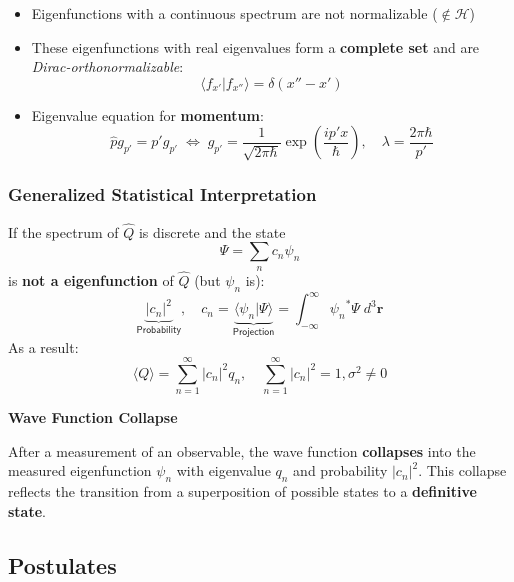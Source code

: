 \newpar{}
\begin{itemize}
    \item Eigenfunctions with a continuous spectrum are not normalizable ($\notin \mathcal{H}$)
    \item These eigenfunctions with real eigenvalues form a \textbf{complete set} and are \textit{Dirac-orthonormalizable}:
          \noindent\begin{equation*}
              \langle f_{x'}|f_{x''}\rangle=\delta(x''-x')
          \end{equation*}
    \item Eigenvalue equation for \textbf{momentum}:
          \noindent\begin{equation*}
              \widehat{p}g_{p'}= p'g_{p'}\;\Leftrightarrow\; g_{p'}=\frac{1}{\sqrt{2\pi\hbar}} \exp\left(\frac{ip'x}{\hbar}\right), \quad \lambda = \frac{2\pi\hbar}{p'}
          \end{equation*}
\end{itemize}

\subsubsection{Generalized Statistical Interpretation}\label{midterm:gen_stat}
If the spectrum of $\hat{Q}$ is discrete and the state
\begin{equation*}
    \Psi=\sum_n c_n \psi_n
\end{equation*}
is \textbf{not a eigenfunction} of $\hat{Q}$ (but $\psi_n$ is):
\noindent\begin{equation*}
    \underbrace{|c_n|^2}_{\textsf{Probability}}, \quad c_n = \underbrace{\langle \psi_n|\Psi\rangle}_{\textsf{Projection}} =\int_{-\infty}^{\infty} {\psi_n}^* \Psi\; d^3 \mathbf{r}
\end{equation*}
As a result:
\noindent\begin{equation*}
    \langle Q\rangle  = \sum_{n=1}^{\infty} |c_n|^2 q_n, \quad  \sum_{n=1}^{\infty} |c_n|^2 = 1, \sigma^2          \neq 0
\end{equation*}

\textbf{Wave Function Collapse}

After a measurement of an observable, the wave function \textbf{collapses} into the measured eigenfunction $\psi_n$ with eigenvalue $q_n$ and probability $|c_n|^2$. This collapse reflects the transition from a superposition of possible states to a \textbf{definitive state}.

\subsection{Postulates}

